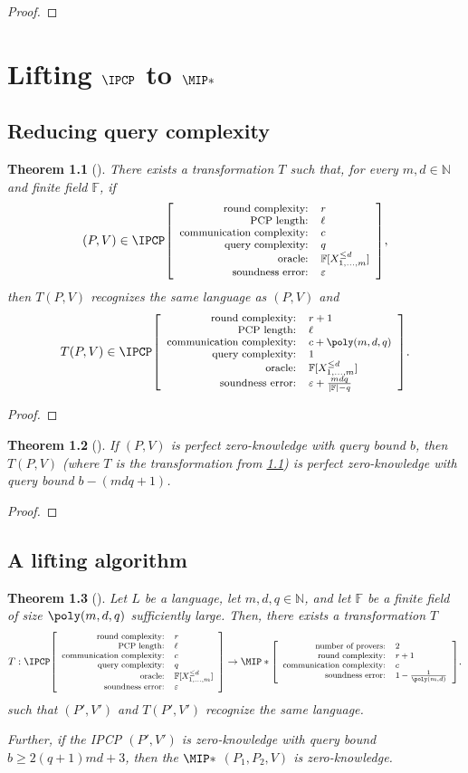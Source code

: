 \documentclass[english]{reedthesis}
\theoremstyle{plain}
\newtheorem{thm}{Theorem}[section]
\theoremstyle{definition}
\theoremstyle{remark}
\DeclarePairedDelimiter{\abs}{\lvert}{\rvert}
\newcommand{\ldipcp}[6]{%
  \ensuremath%
  \mleft[{\footnotesize\begin{array}{r l}
    \text{round complexity:} & #1 \\
    \text{PCP length:} & #2 \\
    \text{communication complexity:} & #3 \\
    \text{query complexity:} & #4 \\
    \text{oracle:} & #5 \\
    \text{soundness error:} & #6
  \end{array}}\mright]%
}
\newcommand{\mipstar}[4]{%
  \ensuremath%
  \mleft[{\footnotesize\begin{array}{r l}
    \text{number of provers:} & #1 \\
    \text{round complexity:} & #2 \\
    \text{communication complexity:} & #3 \\
    \text{soundness error:} & #4
  \end{array}}\mright]%
}
\begin{document}
\begin{proof}
\end{proof}

\chapter{Lifting $\IPCP$ to $\MIP*$}\label{chap:ipcp-to-mip}

\section{Reducing query complexity}

\begin{thm}[{\cite[Prop.\ 9.2]{CFGS22}}]\label{thm:ipcp-one-query}
  There exists a transformation $T$ such that, for every $m, d \in \mathbb{N}$ and finite
  field $\mathbb{F}$, if
  \begin{equation*}
    (P, V) \in \IPCP\ldipcp{r}{\ell}{c}{q}{\mathbb{F}[X_{1, \ldots, m}^{\le d}]}{\varepsilon},
  \end{equation*}
  then $T(P, V)$ recognizes the same language as $(P, V)$ and
  \begin{equation*}
    T(P, V) \in \IPCP\ldipcp{r+1}{\ell}{c+\poly(m,d,q)}{1}{\mathbb{F}[X_{1, \ldots, m}^{\le d}]}{\varepsilon+\frac{mdq}{\abs{\mathbb{F}}-q}}.
  \end{equation*}
\end{thm}

\begin{proof}
\end{proof}

\begin{thm}[{\cite[Prop.\ 9.2]{CFGS22}}]\label{thm:one-query-pzk}
  If $(P, V)$ is perfect zero-knowledge with query bound $b$, then $T(P, V)$
  (where $T$ is the transformation from \cref{thm:ipcp-one-query}) is perfect
  zero-knowledge with query bound $b - (mdq + 1)$.
\end{thm}

\begin{proof}
\end{proof}

\section{A lifting algorithm}

\begin{thm}[{\cite[Lemma 9.1]{CFGS22}}]\label{thm:lift-ipcp-mip}
  Let $L$ be a language, let $m, d, q \in \mathbb{N}$, and let $\mathbb{F}$ be a finite
  field of size $\poly(m, d, q)$ sufficiently large. Then, there exists a
  transformation $T$
  \begin{equation*}
    T: \IPCP\ldipcp{r}{\ell}{c}{q}{\mathbb{F}[X_{1, \ldots, m}^{\le d}]}{\varepsilon}
    \rightarrow \MIP*\mipstar{2}{r+1}{c}{1 - \frac{1}{\poly(m, d)}}.
  \end{equation*}
  such that $(P', V')$ and $T(P', V')$ recognize the same language.

  Further, if the IPCP $(P', V')$ is zero-knowledge with query bound
  $b \ge 2(q+1)md + 3$, then the $\MIP*$ $(P_{1}, P_{2}, V)$ is zero-knowledge.
\end{thm}
\end{document}
